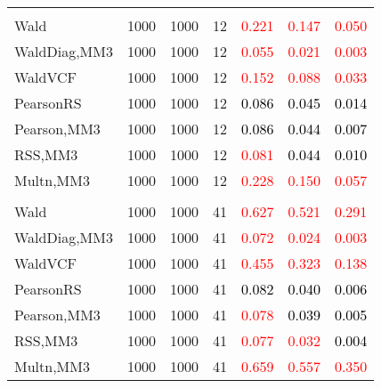 \documentclass[
]{article}
\begin{document}
\begin{table}[H]
{\begin{tabular}[t]{lrrrrrr}
\addlinespace[0.3em]
\multicolumn{7}{l}{\textbf{2F 10V}}\\
\hspace{1em}Wald & 1000 & 1000 & 12 & \textcolor{red}{0.221} & \textcolor{red}{0.147} & \textcolor{red}{0.050}\\
\hspace{1em}WaldDiag,MM3 & 1000 & 1000 & 12 & \textcolor{red}{0.055} & \textcolor{red}{0.021} & \textcolor{red}{0.003}\\
\hspace{1em}WaldVCF & 1000 & 1000 & 12 & \textcolor{red}{0.152} & \textcolor{red}{0.088} & \textcolor{red}{0.033}\\
\hspace{1em}PearsonRS & 1000 & 1000 & 12 & \textcolor{black}{0.086} & \textcolor{black}{0.045} & \textcolor{black}{0.014}\\
\hspace{1em}Pearson,MM3 & 1000 & 1000 & 12 & \textcolor{black}{0.086} & \textcolor{black}{0.044} & \textcolor{black}{0.007}\\
\hspace{1em}RSS,MM3 & 1000 & 1000 & 12 & \textcolor{red}{0.081} & \textcolor{black}{0.044} & \textcolor{black}{0.010}\\
\hspace{1em}Multn,MM3 & 1000 & 1000 & 12 & \textcolor{red}{0.228} & \textcolor{red}{0.150} & \textcolor{red}{0.057}\\
\addlinespace[0.3em]
\multicolumn{7}{l}{\textbf{3F 15V}}\\
\hspace{1em}Wald & 1000 & 1000 & 41 & \textcolor{red}{0.627} & \textcolor{red}{0.521} & \textcolor{red}{0.291}\\
\hspace{1em}WaldDiag,MM3 & 1000 & 1000 & 41 & \textcolor{red}{0.072} & \textcolor{red}{0.024} & \textcolor{red}{0.003}\\
\hspace{1em}WaldVCF & 1000 & 1000 & 41 & \textcolor{red}{0.455} & \textcolor{red}{0.323} & \textcolor{red}{0.138}\\
\hspace{1em}PearsonRS & 1000 & 1000 & 41 & \textcolor{black}{0.082} & \textcolor{black}{0.040} & \textcolor{black}{0.006}\\
\hspace{1em}Pearson,MM3 & 1000 & 1000 & 41 & \textcolor{red}{0.078} & \textcolor{black}{0.039} & \textcolor{black}{0.005}\\
\hspace{1em}RSS,MM3 & 1000 & 1000 & 41 & \textcolor{red}{0.077} & \textcolor{red}{0.032} & \textcolor{black}{0.004}\\
\hspace{1em}Multn,MM3 & 1000 & 1000 & 41 & \textcolor{red}{0.659} & \textcolor{red}{0.557} & \textcolor{red}{0.350}\\
\bottomrule
\end{tabular}}
\endgroup{}
\end{table}
\end{document}
